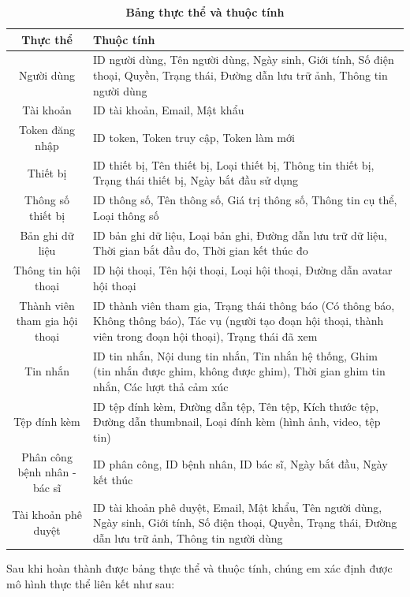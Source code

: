 \begin{table}[H]
  \caption{\bfseries \fontsize{12pt}{0pt}\selectfont Bảng thực thể và thuộc tính}
  \centering
  \begin{tabularx}{0.9\textwidth}{|c|X|}
    \hline
    \textbf{Thực thể} & \textbf{Thuộc tính} \\
    \hline
    Người dùng & 
    ID người dùng, Tên người dùng, Ngày sinh, Giới tính, Số điện thoại, Quyền, Trạng thái, Đường dẫn lưu trữ ảnh, Thông tin người dùng \\
    \hline
    Tài khoản &
    ID tài khoản, Email, Mật khẩu  \\
    \hline
    Token đăng nhập &
    ID token, Token truy cập, Token làm mới \\
    \hline
    Thiết bị & 
    ID thiết bị, Tên thiết bị, Loại thiết bị, Thông tin thiết bị, Trạng thái thiết bị, Ngày bắt đầu sử dụng\\
    \hline
    Thông số thiết bị &
    ID thông số, Tên thông số, Giá trị thông số, Thông tin cụ thể, Loại thông số \\
    \hline
    Bản ghi dữ liệu & 
    ID bản ghi dữ liệu, Loại bản ghi, Đường dẫn lưu trữ dữ liệu, Thời gian bắt đầu đo, Thời gian kết thúc đo \\
    \hline
    Thông tin hội thoại &
    ID hội thoại, Tên hội thoại, Loại hội thoại, Đường dẫn avatar hội thoại \\
    \hline
    Thành viên tham gia hội thoại &
    ID thành viên tham gia, Trạng thái thông báo (Có thông báo, Không thông báo), Tác vụ (người tạo đoạn hội thoại, thành viên trong đoạn hội thoại), Trạng thái đã xem\\
    \hline
    Tin nhắn & 
    ID tin nhắn, Nội dung tin nhắn, Tin nhắn hệ thống, Ghim (tin nhắn được ghim, không được ghim), Thời gian ghim tin nhắn, Các lượt thả cảm xúc \\
    \hline
    Tệp đính kèm &
    ID tệp đính kèm, Đường dẫn tệp, Tên tệp, Kích thước tệp, Đường dẫn thumbnail, Loại đính kèm (hình ảnh, video, tệp tin) \\
    \hline 
    Phân công bệnh nhân - bác sĩ & 
    ID phân công, ID bệnh nhân, ID bác sĩ, Ngày bắt đầu, Ngày kết thúc \\
    Tài khoản phê duyệt & 
    ID tài khoản phê duyệt, Email, Mật khẩu, Tên người dùng, Ngày sinh, Giới tính, Số điện thoại, Quyền, Trạng thái, Đường dẫn lưu trữ ảnh, Thông tin người dùng \\
    \hline
  \end{tabularx}

  
\end{table}
Sau khi hoàn thành được bảng thực thể và thuộc tính, chúng em xác định được mô hình thực thể liên kết như sau:

